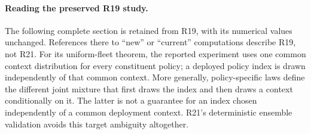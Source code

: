 \paragraph{Reading the preserved R19 study.}
The following complete section is retained from R19, with its numerical values unchanged. References there to ``new'' or ``current'' computations describe R19, not R21. For its uniform-fleet theorem, the reported experiment uses one common context distribution for every constituent policy; a deployed policy index is drawn independently of that common context. More generally, policy-specific laws define the different joint mixture that first draws the index and then draws a context conditionally on it. The latter is not a guarantee for an index chosen independently of a common deployment context. R21's deterministic ensemble validation avoids this target ambiguity altogether.
